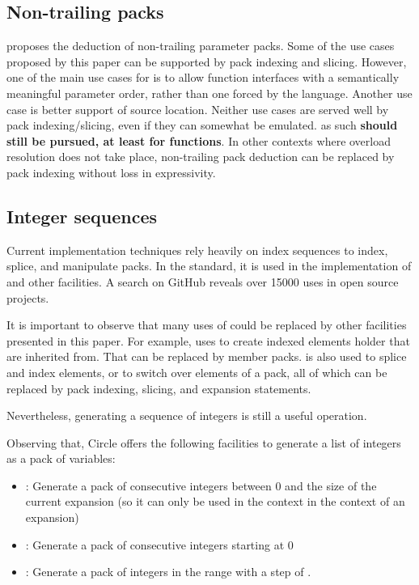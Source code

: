 \documentclass{wg21}
\begin{document}
\subsection{Non-trailing packs}
\label{sec:nontrailing}

 proposes the deduction of non-trailing parameter packs.
Some of the use cases proposed by this paper can be supported by pack indexing and slicing.
However, one of the main use cases for  is to allow function interfaces with
a semantically meaningful parameter order, rather than one forced by the language.
Another use case is better support of source location.
Neither use cases are served well by pack indexing/slicing, even if they can somewhat be emulated.
as such \textbf{ should still be pursued, at least for functions}.
In other contexts where overload resolution does not take place, non-trailing pack deduction
can be replaced by pack indexing without loss in expressivity.

\subsection{Integer sequences}
\label{sec:indexsequence}


Current implementation techniques rely heavily on index sequences to index, splice, and manipulate packs.
In the standard, it is used in the implementation of  and other facilities.
A search on GitHub reveals over 15000 uses in open source projects.

It is important to observe that many uses of  could be replaced by other facilities presented in this paper.
For example,  uses  to create indexed elements holder that are inherited from.
That can be replaced by member packs.
  is also used to splice and index elements, or to switch over elements of a pack, all of which can be
replaced by pack indexing, slicing, and expansion statements.

Nevertheless, generating a sequence of integers is still a useful operation.

Observing that, Circle offers the following facilities to generate a list of integers as a pack of variables:

\begin{itemize}
\item {}: Generate a pack of consecutive integers between 0 and the size of the current expansion (so it can only be used in the context in the context of an expansion)
\item {} : Generate a pack of  consecutive integers starting at 0
\item {} : Generate a pack of integers in the range  with a step of .
\end{itemize}
\end{document}
